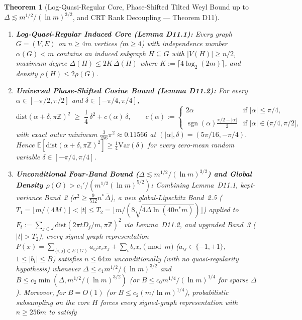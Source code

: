 \documentclass[11pt,a4paper]{article}
\newtheorem{theorem}{Theorem}[section]
\theoremstyle{definition}
\newcommand{\Z}{\mathbb{Z}}
\begin{document}
\begin{theorem}[Log-Quasi-Regular Core, Phase-Shifted Tilted Weyl Bound up to $\Delta \lesssim m^{1/2}/(\ln m)^{3/2}$, and CRT Rank Decoupling --- Theorem D11]
\label{thm:d11}
\begin{enumerate}[leftmargin=*,nosep]
  \item \textbf{Log-Quasi-Regular Induced Core (Lemma D11.1):} Every graph $G = (V, E)$ on $n \ge 4m$ vertices ($m \ge 4$) with independence number $\alpha(G) < m$ contains an induced subgraph $H \subseteq G$ with $|V(H)| \ge n/2$, maximum degree $\Delta(H) \le 2K\,\bar{\Delta}(H)$ where $K := \lceil 4\log_2(2m) \rceil$, and density $\rho(H) \le 2\rho(G)$.
  \item \textbf{Universal Phase-Shifted Cosine Bound (Lemma D11.2):} For every $\alpha \in [-\pi/2, \pi/2]$ and $\delta \in [-\pi/4, \pi/4]$,
  \[
    \mathrm{dist}(\alpha + \delta, \pi\Z)^2 \;\ge\; \frac{1}{4}\,\delta^2 + c(\alpha)\,\delta, \qquad
    c(\alpha) := \begin{cases} 2\alpha & \text{if } |\alpha| \le \pi/4, \\ \operatorname{sgn}(\alpha)\frac{\pi/2 - |\alpha|}{2} & \text{if } |\alpha| \in (\pi/4, \pi/2], \end{cases}
  \]
  with exact outer minimum $\frac{3}{256}\pi^2 \approx 0.11566$ at $(|\alpha|, \delta) = (5\pi/16, -\pi/4)$. Hence $\mathbb{E}[\mathrm{dist}(\alpha + \delta, \pi\Z)^2] \ge \frac{1}{4}\mathrm{Var}(\delta)$ for every zero-mean random variable $\delta \in [-\pi/4, \pi/4]$.
  \item \textbf{Unconditional Four-Band Bound ($\Delta \lesssim m^{1/2}/(\ln m)^{3/2}$) and Global Density $\rho(G) > c_1' / (m^{1/2}(\ln m)^{5/2})$:} Combining Lemma~D11.1, kept-variance Band~2 ($\sigma^2 \ge \frac{9}{512} n^*\bar{\Delta}$), a new global-Lipschitz \emph{Band~2.5} ($T_1 = \lfloor m/(4M)\rfloor < |t| \le T_2 = \lfloor m/(8\sqrt{4\Delta \ln(40 n^* m)})\rfloor$) applied to $F_t := \sum_{j\in J} \mathrm{dist}(2\pi t D_j/m, \pi\Z)^2$ via Lemma~D11.2, and upgraded Band~3 ($|t| > T_2$), every signed-graph representation $P(x) = \sum_{\{i,j\}\in E(G)} a_{ij} x_i x_j + \sum_i b_i x_i \pmod m$ ($a_{ij} \in \{-1, +1\}$, $1 \le |b_i| \le B$) satisfies $n \le 64m$ unconditionally (with no quasi-regularity hypothesis) whenever $\Delta \le c_1 m^{1/2}/(\ln m)^{3/2}$ and $B \le c_2 \min(\Delta, m^{1/2}/(\ln m)^{3/2})$ (or $B \le c_0 m^{1/4}/(\ln m)^{1/4}$ for sparse $\Delta$). Moreover, for $B = O(1)$ (or $B \le c_2 (m / \ln m)^{1/4}$), probabilistic subsampling on the core $H$ forces every signed-graph representation with $n \ge 256m$ to satisfy

\end{enumerate}
\end{theorem}
\end{document}
